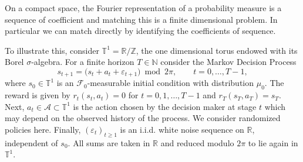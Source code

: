 \documentclass[reqno, 11pt]{amsart}%
\newcommand\RR{\mathbb R}
\theoremstyle{definition}
\begin{document}
On a compact space, the Fourier representation of a probability measure is a sequence of coefficient and matching this is a finite dimensional problem. In particular we can match directly by identifying the coefficients of sequence.  

To illustrate this, consider $\mathbb{T}^{1} = \mathbb{R}/\mathbb{Z}$, the one dimensional torus endowed with its Borel $\sigma$-algebra.
For a finite horizon $T \in \mathbb{N}$ consider the Markov Decision Process
\begin{equation*}
s_{t+1} = \bigl(s_{t} + a_{t} + \varepsilon_{t+1}\bigr) \bmod 2\pi,
\qquad t = 0,\dots,T-1,
\end{equation*}
where $s_0 \in \mathbb{T}^{1}$ is an $\mathcal F_0$-measurable initial condition with distribution $\mu_0$. The reward is given by $r_t(s_t,a_t)=0$ for $t=0,1,\ldots,T-1$ and $r_T(s_T,a_T)=s_T.$  Next,  $a_{t}\in\mathcal A\subset\mathbb{T}^{1}$ is the action chosen by the decision maker at stage $t$ which may depend on the observed history of the process. We consider randomized policies here.
Finally, $(\varepsilon_{t})_{t\ge 1}$ is an i.i.d. white noise sequence on $\RR$, independent of $s_0$. All sums are taken in $\mathbb{R}$ and reduced modulo $2\pi$ to lie again in $\mathbb{T}^{1}$.
\end{document}
